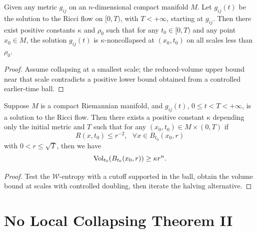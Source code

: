 \begin{theorem}
  \label{thm:cz-no-local-collapsing-on-a-finite-time-interval}
Given any metric $g_{ij}$ on an $n$-dimensional compact manifold
$M$. Let $g_{ij}(t)$ be the solution to the Ricci flow on $[0,T)$,
with $T<+\infty$, starting at $g_{ij}$. Then there exist positive
constants $\kappa$ and $\rho_0$ such that for any $t_0\in[0,T)$
and any point $x_0\in M$, the solution $g_{ij}(t)$ is
$\kappa$-noncollapsed at $(x_0,t_0)$ on all scales less than
$\rho_0$.
\end{theorem}

\begin{proof}
  \sketch Assume collapsing at a smallest scale; the reduced-volume upper bound near that scale contradicts a positive lower bound obtained from a controlled earlier-time ball.
\end{proof}

\begin{theorem}
  \label{thm:cz-scale-local-no-collapsing}
Suppose $M$ is a compact Riemannian manifold, and $g_{ij}(t)$,
$0\leq t<T<+\infty$, is a solution to the Ricci flow. Then there
exists a positive constant $\kappa$ depending only the initial
metric and $T$ such that for any $(x_0,t_0)\in M\times(0,T)$ if
$$
R(x,t_0)\leq r^{-2},\ \ \ \forall x\in B_{t_0}(x_0,r)
$$
with $0<r\leq\sqrt{T}$, then we have
$$
{\rm Vol}_{t_0}(B_{t_0}(x_0,r))\geq\kappa r^n.
$$
\end{theorem}

\begin{proof}
  \sketch Test the $\mathcal W$-entropy with a cutoff supported in the ball, obtain the volume bound at scales with controlled doubling, then iterate the halving alternative.
\end{proof}

\section{No Local Collapsing Theorem II}

